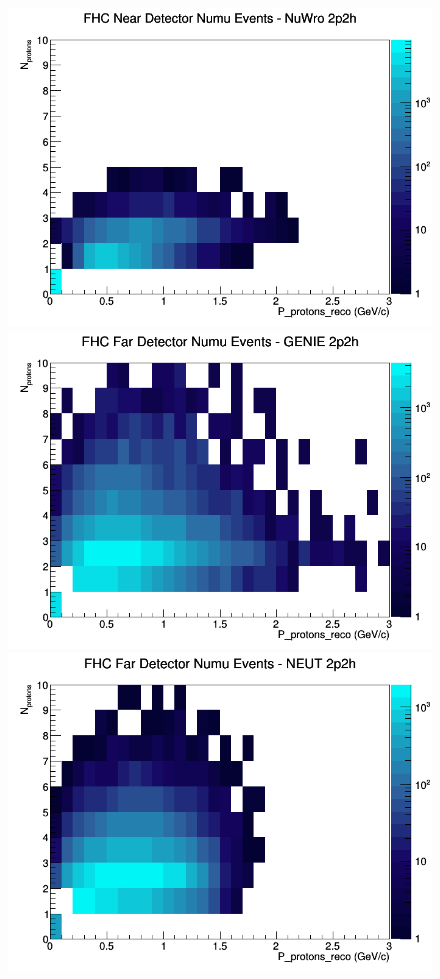 \documentclass[12pt]{article}
\begin{document}
\begin{figure}[h]
\includegraphics[width=\linewidth]{eff_N_P/FGT/protons/2p2h_FHC_ND_numu_N_P_NuWro.png}
\endminipage
\newline
{}
\includegraphics[width=\linewidth]{eff_N_P/FGT/protons/2p2h_FHC_FD_numu_N_P_GENIE.png}
\endminipage
{}
\includegraphics[width=\linewidth]{eff_N_P/FGT/protons/2p2h_FHC_FD_numu_N_P_NEUT.png}

\end{figure}
\end{document}
